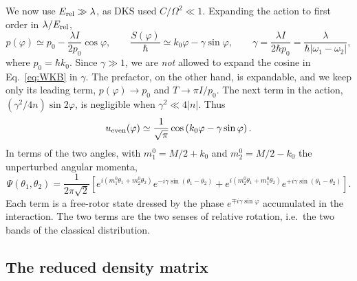 \documentclass[aps,preprint,12pt,superscriptaddress,nofootinbib]{revtex4-2}
\newcommand{\Erel}{E_{\rm rel}}
\begin{document}
We now use $\Erel\gg\lambda$, as DKS used $C/\Omega^{2}\ll1$. Expanding the action to
first order in $\lambda/\Erel$,
\begin{equation}
p(\varphi)\simeq p_{0}-\frac{\lambda I}{2p_{0}}\cos\varphi,\qquad
\frac{S(\varphi)}{\hbar}\simeq k_{0}\varphi-\gamma\sin\varphi,\qquad
\gamma=\frac{\lambda I}{2\hbar p_{0}}=\frac{\lambda}{\hbar|\omega_{1}-\omega_{2}|},
\label{eq:Sexp}
\end{equation}
where $p_{0}=\hbar k_{0}$. Since $\gamma\gg1$, we are \emph{not} allowed to expand
the cosine in Eq.~\eqref{eq:WKB} in $\gamma$. The prefactor, on the other hand, is
expandable, and we keep only its leading term, $p(\varphi)\to p_{0}$ and
$T\to\pi I/p_{0}$. The next term in the action, $(\gamma^{2}/4n)\sin2\varphi$, is
negligible when $\gamma^{2}\ll4|n|$. Thus
\begin{equation}
u_{\rm even}(\varphi)\simeq\frac{1}{\sqrt\pi}\cos\left(k_{0}\varphi-\gamma\sin\varphi\right).
\label{eq:uexp}
\end{equation}
In terms of the two angles, with $m_{1}^{0}=M/2+k_{0}$ and $m_{2}^{0}=M/2-k_{0}$ the
unperturbed angular momenta,
\begin{equation}
\Psi(\theta_{1},\theta_{2})=\frac{1}{2\pi\sqrt2}\left[
e^{i(m_{1}^{0}\theta_{1}+m_{2}^{0}\theta_{2})}e^{-i\gamma\sin(\theta_{1}-\theta_{2})}
+e^{i(m_{2}^{0}\theta_{1}+m_{1}^{0}\theta_{2})}e^{+i\gamma\sin(\theta_{1}-\theta_{2})}
\right].
\label{eq:Psi2}
\end{equation}
Each term is a free-rotor state dressed by the phase $e^{\mp i\gamma\sin\varphi}$
accumulated in the interaction. The two terms are the two senses of relative
rotation, i.e.\ the two bands of the classical distribution.

\subsection{The reduced density matrix}
\end{document}
